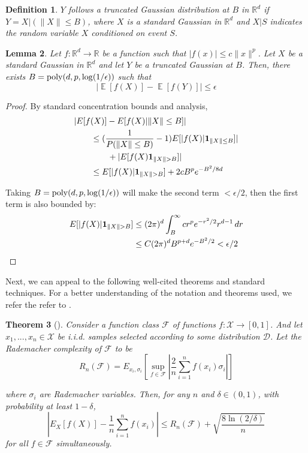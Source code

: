 \documentclass{article}
\newtheorem{theorem}{Theorem}[section]
\newtheorem{lemma}[theorem]{Lemma}
\newtheorem{definition}[theorem]{Definition}
\newcommand{\R}{{\mathbb{R}}}
\DeclareMathOperator*{\expt}{\mathbb{E}}
\begin{document}
\begin{definition}
$Y$ follows a truncated Gaussian distribution at $B$ in $\R^d$ if $Y = X | ( \|X\| \leq B)$, where $X$ is a standard Gaussian in $\R^d$ and $ X \Big|S$ indicates the random variable $X$ conditioned on event $S$.
\end{definition}
%
\begin{lemma}
\label{choppedLem}
Let $f : \R^d \to \R$ be a function such that $|f(x)| \leq c\|x\|^p$. Let $X$ be a standard Gaussian in $\R^d$ and let $Y$ be a truncated Gaussian at $B$. Then, there exists $B = \mathrm{poly}(d,p,\log(1/\epsilon))$ such that 
\[ \left|\expt[f(X)] - \expt[f(Y)] \right| \leq \epsilon\]
\end{lemma}

\begin{proof}
By standard concentration bounds and analysis, 
\begin{align*}
& |E[f(X)] - E[f(X)| \|X\|\leq B]| \\
& \qquad \leq (\frac{1}{P(\|X\|\leq B)}- 1) E[|f(X)|{\bf 1}_{\|X\|\leq B}]| \\
& \qquad \qquad + |E[f(X){\bf 1}_{\|X\|>B}]| \\
& \qquad \leq E[|f(X)|{\bf 1}_{\|X\|>B}] + 2cB^pe^{-B^2/8d}
\end{align*}


Taking $B = \mathrm{poly}(d,p,\log(1/\epsilon))$ will make the second term $< \epsilon/2$, then the first term is also bounded by:
\begin{align*}
  E[|f(X)|{\bf 1}_{\|X\|>B}] &\leq (2\pi)^d \int_B^\infty cr^pe^{-r^2/2}r^{d-1}\,dr \\
                             &\leq C(2\pi)^dB^{p+d}e^{-B^2/2} < \epsilon/2
\end{align*}
\end{proof}

Next, we can appeal to the following well-cited theorems and standard techniques. For a better understanding of the notation and theorems used, we refer the refer to \cite{bartlett2002rademacher}.
%
\begin{theorem}[\cite{bartlett2002rademacher}]\label{rademacher}
Consider a function class $\mathcal{F}$ of functions $f : \mathcal{X} \to [0,1]$. And let $ x_1,...,x_n \in \mathcal{X}$ be i.i.d. samples selected according to some distribution $\mathcal{D}$. Let the Rademacher complexity of $\mathcal{F}$ to be 
\[R_n (\mathcal{F}) = E_{x_i,\sigma_i}\left[\sup_{f \in \mathcal{F}} \left|\frac{2}{n}\sum_{i=1}^nf(x_i)\sigma_i\right|\right]\]

where $\sigma_i$ are Rademacher variables. Then, for any $n$ and $\delta \in (0,1)$, with probability at least $1-\delta$, 
\[|E_{X}[f(X)]  - \frac{1}{n}\sum_{i=1}^n f(x_i)| \leq R_n(\mathcal{F}) + \sqrt{\frac{8\ln(2/\delta)}{n}} \]
for all $f \in\mathcal{F}$ simultaneously.
\end{theorem}
\end{document}

